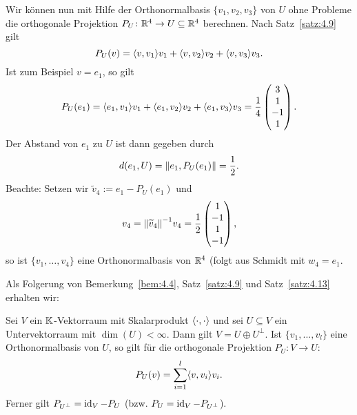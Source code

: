 \begin{beispiel}
\begin{enumerate}[(i)]
\[		\]
		Wir können nun mit Hilfe der Orthonormalbasis $\{v_1,v_2,v_3\}$ von $U$ ohne Probleme die orthogonale Projektion $P_U\colon \mathbb{R}^4 \rightarrow U \subseteq \mathbb{R}^4$ berechnen.
		Nach Satz~\ref{satz:4.9} gilt
		\[
			P_U(v) = \sk{v,v_1} v_1 + \sk{v,v_2} v_2 + \sk{v,v_3} v_3.
		\]
		Ist zum Beispiel $v = e_1$, so gilt
		\[
			P_U(e_1) = \sk{e_1,v_1} v_1 + \sk{e_1,v_2} v_2 + \sk{e_1,v_3} v_3 =
			\frac{1}{4} \begin{pmatrix} 3 \\ 1 \\ -1 \\ 1 \end{pmatrix}.
		\]
		Der Abstand von $e_1$ zu $U$ ist dann gegeben durch
		\[
			d(e_1,U) = \left\lVert e_1,P_U(e_1)\right\rVert = \frac{1}{2}.
		\]
		Beachte: Setzen wir $\widetilde{v}_4 := e_1 - P_U(e_1)$ und
		\[
			v_4 = \no{\widetilde{v}_4}^{-1} v_4 = \frac{1}{2} \begin{pmatrix}
			1 \\ -1 \\ 1 \\ -1
			\end{pmatrix},
		\]
		so ist $\{v_1,\dots,v_4\}$ eine Orthonormalbasis von $\mathbb{R}^4$ (folgt aus Schmidt mit $w_4 = e_1$.
	\end{enumerate}
\end{beispiel}

Als Folgerung von Bemerkung~\ref{bem:4.4}, Satz~\ref{satz:4.9} und Satz~\ref{satz:4.13} erhalten wir:
\begin{satz}
	\label{satz:4.16}
	Sei $V$ ein $\mathbb{K}$-Vektorraum mit Skalarprodukt $\left\langle\cdot,\cdot\right\rangle$ und sei $U \subseteq V$ ein Untervektorraum mit $\dim(U) < \infty$.
	Dann gilt $V = U \oplus U^\perp$.
	Ist $\{v_1,\dots,v_l\}$ eine Orthonormalbasis von $U$, so gilt für die orthogonale Projektion $P_U \colon V \rightarrow U$:
	\[
		P_U(v) = \sum\limits_{i=1}^{l} \sk{v,v_i} v_i.
	\]
	Ferner gilt $P_{U^\perp} = \operatorname{id}_V - P_U$ (bzw. $P_U = \operatorname{id}_V - P_{U^\perp}$).
\end{satz}

